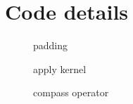 \documentclass{article}
\begin{document}
\section*{Code details}
\begin{figure}[h]
    \centering
    \begin{minipage}{.5\textwidth}
        \centering
        \caption*{padding}
    \end{minipage}%
    \begin{minipage}{.5\textwidth}
        \centering
        \caption*{apply kernel}
    \end{minipage}%
\end{figure}
\begin{figure}[h]
    \centering
    \begin{minipage}{.7\textwidth}
        \centering
        \caption*{compass operator}
    \end{minipage}%
\end{figure}
\end{document}
